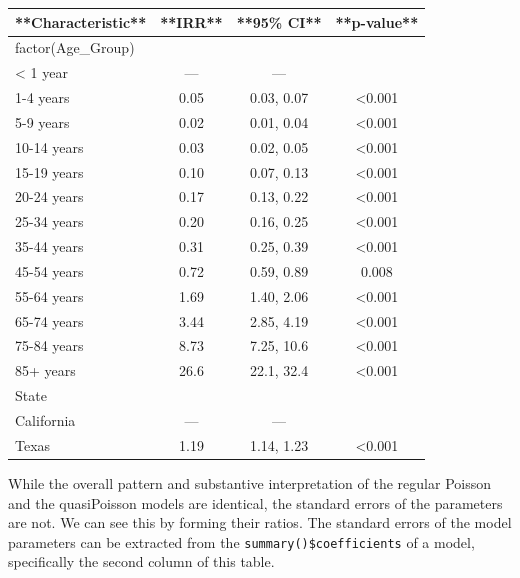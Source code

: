 \documentclass[
  letterpaper,
  DIV=11,
  numbers=noendperiod]{scrreprt}
\begin{document}
\begin{tabular}{l|c|c|c}
\hline
**Characteristic** & **IRR** & **95\% CI** & **p-value**\\
\hline
factor(Age\_Group) &  &  & \\
\hline
< 1 year & — & — & \\
\hline
1-4 years & 0.05 & 0.03, 0.07 & <0.001\\
\hline
5-9 years & 0.02 & 0.01, 0.04 & <0.001\\
\hline
10-14 years & 0.03 & 0.02, 0.05 & <0.001\\
\hline
15-19 years & 0.10 & 0.07, 0.13 & <0.001\\
\hline
20-24 years & 0.17 & 0.13, 0.22 & <0.001\\
\hline
25-34 years & 0.20 & 0.16, 0.25 & <0.001\\
\hline
35-44 years & 0.31 & 0.25, 0.39 & <0.001\\
\hline
45-54 years & 0.72 & 0.59, 0.89 & 0.008\\
\hline
55-64 years & 1.69 & 1.40, 2.06 & <0.001\\
\hline
65-74 years & 3.44 & 2.85, 4.19 & <0.001\\
\hline
75-84 years & 8.73 & 7.25, 10.6 & <0.001\\
\hline
85+ years & 26.6 & 22.1, 32.4 & <0.001\\
\hline
State &  &  & \\
\hline
California & — & — & \\
\hline
Texas & 1.19 & 1.14, 1.23 & <0.001\\
\hline
\end{tabular}

While the overall pattern and substantive interpretation of the regular
Poisson and the quasiPoisson models are identical, the standard errors
of the parameters are not. We can see this by forming their ratios. The
standard errors of the model parameters can be extracted from the
\texttt{summary()\$coefficients} of a model, specifically the second
column of this table.
\end{document}
